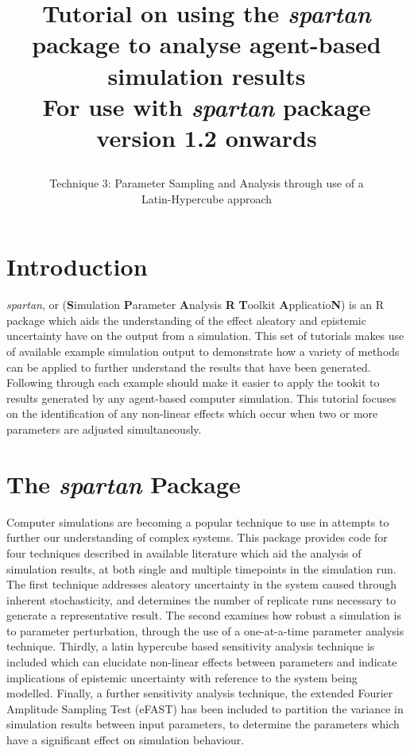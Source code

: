 \documentclass[a4paper,11pt]{article}
\title{\huge \textbf{Tutorial on using the \textit{spartan} package to analyse agent-based simulation results}\\
\Large For use with \textit{spartan} package version 1.2 onwards
\author{\Large Technique 3: Parameter Sampling and Analysis through use of a \\ \Large Latin-Hypercube approach}
\date{}
}
\begin{document}
\maketitle

\section{Introduction}
\noindent \textit{spartan}, or (\textbf{S}imulation \textbf{P}arameter \textbf{A}nalysis \textbf{R} \textbf{T}oolkit \textbf{A}pplicatio\textbf{N}) is an R package which aids the understanding of the effect aleatory and epistemic uncertainty have on the output from a simulation. This set of tutorials makes use of available example simulation output to demonstrate how a variety of methods can be applied to further understand the results that have been generated.  Following through each example should make it easier to apply the tookit to results generated by any agent-based computer simulation.  This tutorial focuses on the identification of any non-linear effects which occur when two or more parameters are adjusted simultaneously.

\section{The \textit{spartan} Package}
\noindent Computer simulations are becoming a popular technique to use in attempts to further our understanding of complex systems. This package provides code for four techniques described in available literature which aid the analysis of simulation results, at both single and multiple timepoints in the simulation run. The first technique addresses aleatory uncertainty in the system caused through inherent stochasticity, and determines the number of replicate runs necessary to generate a representative result. The second examines how robust a simulation is to parameter perturbation, through the use of a one-at-a-time parameter analysis technique. Thirdly, a latin hypercube based sensitivity analysis technique is included which can elucidate non-linear effects between parameters and indicate implications of epistemic uncertainty with reference to the system being modelled. Finally, a further sensitivity analysis technique, the extended Fourier Amplitude Sampling Test (eFAST) has been included to partition the variance in simulation results between input parameters, to determine the parameters which have a significant effect on simulation behaviour.
\end{document}
